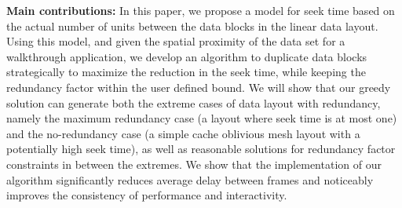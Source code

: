 {\bf Main contributions:}
In this paper, we propose a model for seek time based on the actual
number of units
between the data blocks in the linear data layout. Using this model, and given
the spatial proximity of the data set for a walkthrough application, we develop
an algorithm to duplicate data blocks strategically to maximize the reduction
in the seek time, while keeping the redundancy factor within the user defined
bound. We will show that our greedy solution can generate both the extreme cases
of data layout with redundancy, namely the maximum redundancy case
(a layout where seek time is at most one) and the no-redundancy case (a simple
cache oblivious mesh layout with a potentially high seek time), as well as
reasonable solutions for redundancy factor constraints in between the extremes.
We show that the
implementation of our algorithm significantly reduces average delay between
frames and noticeably improves the consistency of performance and
interactivity.